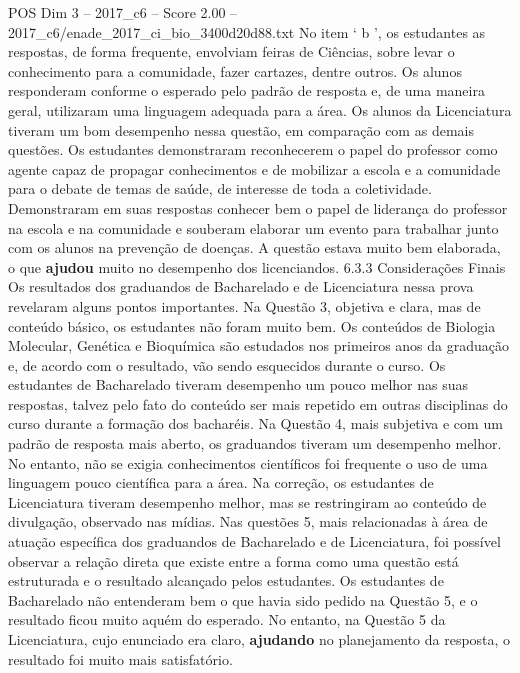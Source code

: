 \begin{textsample}{POS Dim 3 – 2017\_c6 – Score 2.00 – 2017\_c6/enade\_2017\_ci\_bio\_3400d20d88.txt}
No item ‘ b ’, os estudantes as respostas, de forma frequente, envolviam feiras de Ciências, sobre levar o conhecimento para a comunidade, fazer cartazes, dentre outros.
Os alunos responderam conforme o esperado pelo padrão de resposta e, de uma maneira geral, utilizaram uma linguagem adequada para a área.
Os alunos da Licenciatura tiveram um bom desempenho nessa questão, em comparação com as demais questões.
Os estudantes demonstraram reconhecerem o papel do professor como agente capaz de propagar conhecimentos e de mobilizar a escola e a comunidade para o debate de temas de saúde, de interesse de toda a coletividade.
Demonstraram em suas respostas conhecer bem o papel de liderança do professor na escola e na comunidade e souberam elaborar um evento para trabalhar junto com os alunos na prevenção de doenças.
A questão estava muito bem elaborada, o que \textbf{ajudou} muito no desempenho dos licenciandos. 6.3.3 Considerações Finais Os resultados dos graduandos de Bacharelado e de Licenciatura nessa prova revelaram alguns pontos importantes.
Na Questão 3, objetiva e clara, mas de conteúdo básico, os estudantes não foram muito bem.
Os conteúdos de Biologia Molecular, Genética e Bioquímica são estudados nos primeiros anos da graduação e, de acordo com o resultado, vão sendo esquecidos durante o curso.
Os estudantes de Bacharelado tiveram desempenho um pouco melhor nas suas respostas, talvez pelo fato do conteúdo ser mais repetido em outras disciplinas do curso durante a formação dos bacharéis.
Na Questão 4, mais subjetiva e com um padrão de resposta mais aberto, os graduandos tiveram um desempenho melhor.
No entanto, não se exigia conhecimentos científicos foi frequente o uso de uma linguagem pouco científica para a área.
Na correção, os estudantes de Licenciatura tiveram desempenho melhor, mas se restringiram ao conteúdo de divulgação, observado nas mídias.
Nas questões 5, mais relacionadas à área de atuação específica dos graduandos de Bacharelado e de Licenciatura, foi possível observar a relação direta que existe entre a forma como uma questão está estruturada e o resultado alcançado pelos estudantes.
Os estudantes de Bacharelado não entenderam bem o que havia sido pedido na Questão 5, e o resultado ficou muito aquém do esperado.
No entanto, na Questão 5 da Licenciatura, cujo enunciado era claro, \textbf{ajudando} no planejamento da resposta, o resultado foi muito mais satisfatório.

\end{textsample}
